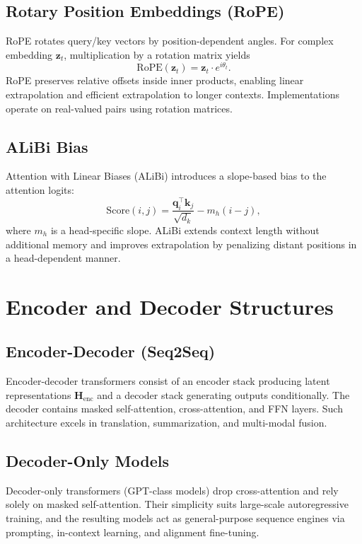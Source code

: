 \documentclass{article}
\begin{document}
\subsection{Rotary Position Embeddings (RoPE)}
RoPE rotates query/key vectors by position-dependent angles. For complex embedding $\mathbf{z}_t$, multiplication by a rotation matrix yields
\begin{equation}
  \mathrm{RoPE}(\mathbf{z}_t) = \mathbf{z}_t \cdot e^{i \theta_t}.
\end{equation}
RoPE preserves relative offsets inside inner products, enabling linear extrapolation and efficient extrapolation to longer contexts. Implementations operate on real-valued pairs using rotation matrices.

\subsection{ALiBi Bias}
Attention with Linear Biases (ALiBi) introduces a slope-based bias to the attention logits:
\begin{equation}
  \mathrm{Score}(i, j) = \frac{\mathbf{q}_i^\top \mathbf{k}_j}{\sqrt{d_k}} - m_h (i - j),
\end{equation}
where $m_h$ is a head-specific slope. ALiBi extends context length without additional memory and improves extrapolation by penalizing distant positions in a head-dependent manner.

\section{Encoder and Decoder Structures}
\subsection{Encoder-Decoder (Seq2Seq)}
Encoder-decoder transformers consist of an encoder stack producing latent representations $\mathbf{H}_{\text{enc}}$ and a decoder stack generating outputs conditionally. The decoder contains masked self-attention, cross-attention, and FFN layers. Such architecture excels in translation, summarization, and multi-modal fusion.

\subsection{Decoder-Only Models}
Decoder-only transformers (GPT-class models) drop cross-attention and rely solely on masked self-attention. Their simplicity suits large-scale autoregressive training, and the resulting models act as general-purpose sequence engines via prompting, in-context learning, and alignment fine-tuning.
\end{document}
